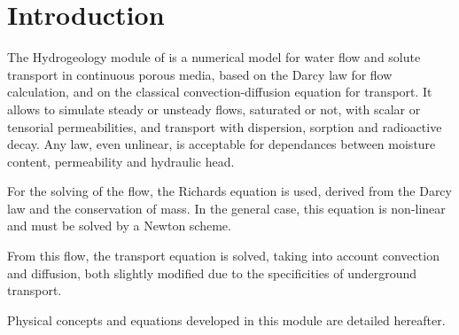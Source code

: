 
%
%
%
%



\section{Introduction}

\hypertarget{groundwater}{}

The Hydrogeology module of \CS is a numerical model for water flow and solute
transport in continuous porous media,
based on the Darcy law for flow calculation, and on the classical
convection-diffusion equation for transport.
It allows to simulate steady or unsteady flows, saturated or not, with scalar or
tensorial permeabilities, and transport with dispersion, sorption and radioactive decay.
Any law, even unlinear, is acceptable for dependances between moisture content,
permeability and hydraulic head.

For the solving of the flow, the Richards equation is used, derived from the Darcy law and the conservation of mass.
In the general case, this equation is non-linear and must be solved by a Newton scheme.

From this flow, the transport equation is solved, taking into account convection and diffusion,
both slightly modified due to the specificities of underground transport.

Physical concepts and equations developed in this module are detailed hereafter.

